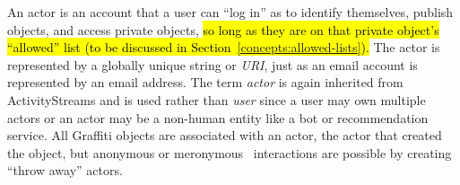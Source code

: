 An actor is an account that a user can ``log in'' as
to identify themselves, publish objects, and access private objects,
\hl{%
so long as they are on that private object's ``allowed'' list
(to be discussed in Section~{\ref{concepts:allowed-lists}}).
}%
The actor is represented by a globally unique string or \emph{URI},
just as an email account is represented by an email address.
The term \emph{actor} is again inherited from ActivityStreams
and is used rather than \emph{user} since a user may own
multiple actors or
an actor may be a non-human entity
like a bot or recommendation service.
All Graffiti objects are associated with an actor, the actor
that created the object, but anonymous
or meronymous~\cite{meronymous} interactions are possible by
creating ``throw away'' actors.





